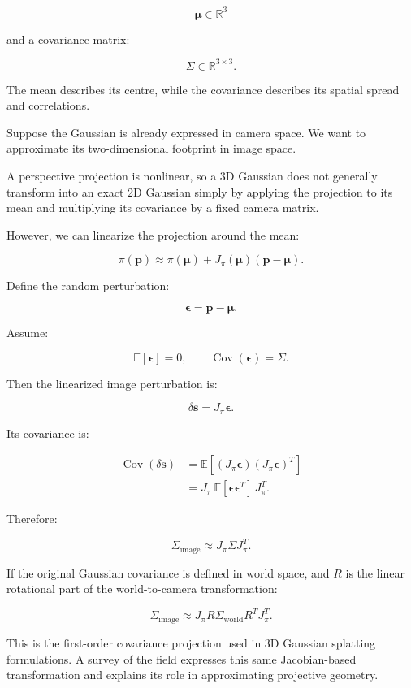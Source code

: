\[
\boldsymbol\mu\in\mathbb R^3
\]

and a covariance matrix:

\[
\Sigma\in\mathbb R^{3\times3}.
\]

The mean describes its centre, while the covariance describes its spatial spread and correlations.

Suppose the Gaussian is already expressed in camera space. We want to approximate its two-dimensional footprint in image space.

A perspective projection is nonlinear, so a 3D Gaussian does not generally transform into an exact 2D Gaussian simply by applying the projection to its mean and multiplying its covariance by a fixed camera matrix.

However, we can linearize the projection around the mean:

\[
\pi(\mathbf p) \approx \pi(\boldsymbol\mu) + J_\pi(\boldsymbol\mu) (\mathbf p-\boldsymbol\mu).
\]

Define the random perturbation:

\[
\boldsymbol\epsilon=\mathbf p-\boldsymbol\mu.
\]

Assume:

\[
\mathbb E[\boldsymbol\epsilon]=0, \qquad \operatorname{Cov}(\boldsymbol\epsilon)=\Sigma.
\]

Then the linearized image perturbation is:

\[
\delta\mathbf s=J_\pi\boldsymbol\epsilon.
\]

Its covariance is:

\[
\begin{aligned} \operatorname{Cov}(\delta\mathbf s) &=\mathbb E[ (J_\pi\boldsymbol\epsilon) (J_\pi\boldsymbol\epsilon)^T ]\\ &=J_\pi\, \mathbb E[\boldsymbol\epsilon\boldsymbol\epsilon^T]\, J_\pi^T. \end{aligned}
\]

Therefore:

\[
\boxed{ \Sigma_{\text{image}} \approx J_\pi\Sigma J_\pi^T }.
\]

If the original Gaussian covariance is defined in world space, and \(R\) is the linear rotational part of the world-to-camera transformation:

\[
\boxed{ \Sigma_{\text{image}} \approx J_\pi R\Sigma_{\text{world}}R^TJ_\pi^T }.
\]

This is the first-order covariance projection used in 3D Gaussian splatting formulations. A survey of the field expresses this same Jacobian-based transformation and explains its role in approximating projective geometry. 

